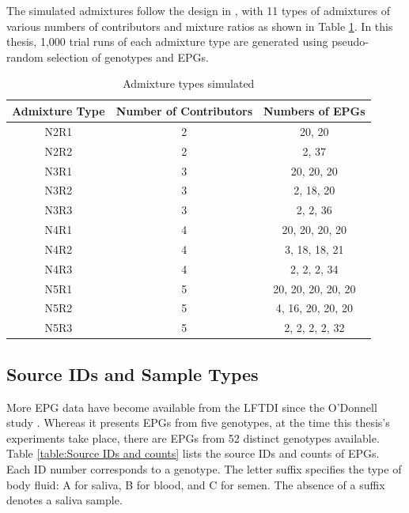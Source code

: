 The simulated admixtures follow the design in \cite{odonnell_clustering_2021}, with 11 types of admixtures of various numbers of contributors and mixture ratios as shown in Table \ref{table:Admixture types simulated}. In this thesis, 1,000 trial runs of each admixture type are generated using pseudo-random selection of genotypes and EPGs.

\begin{table}
\centering
\begin{tabular}{ccc}
\toprule
Admixture Type &  Number of Contributors &    Numbers of EPGs \\
\midrule
          N2R1 &                       2 &             20, 20 \\
          N2R2 &                       2 &              2, 37 \\
          N3R1 &                       3 &         20, 20, 20 \\
          N3R2 &                       3 &          2, 18, 20 \\
          N3R3 &                       3 &           2, 2, 36 \\
          N4R1 &                       4 &     20, 20, 20, 20 \\
          N4R2 &                       4 &      3, 18, 18, 21 \\
          N4R3 &                       4 &        2, 2, 2, 34 \\
          N5R1 &                       5 & 20, 20, 20, 20, 20 \\
          N5R2 &                       5 &  4, 16, 20, 20, 20 \\
          N5R3 &                       5 &     2, 2, 2, 2, 32 \\
\bottomrule
\end{tabular}
\caption{Admixture types simulated}
\label{table:Admixture types simulated}
\end{table}

\subsection{Source IDs and Sample Types}
\label{subsection:Source IDs and Sample Types}

More EPG data have become available from the LFTDI since the O'Donnell study \cite{odonnell_clustering_2021}. Whereas it presents EPGs from five genotypes, at the time this thesis's experiments take place, there are EPGs from 52 distinct genotypes available. Table \ref{table:Source IDs and counts} lists the source IDs and counts of EPGs. Each ID number corresponds to a genotype. The letter suffix specifies the type of body fluid: A for saliva, B for blood, and C for semen. The absence of a suffix denotes a saliva sample.

